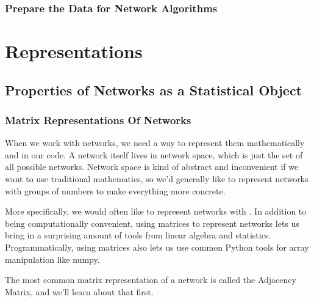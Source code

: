 \documentclass[letterpaper,10pt,english]{jupyterBook}
\begin{document}
\section{Prepare the Data for Network Algorithms}
\label{\detokenize{foundations/ch3/prepare-the-data:prepare-the-data-for-network-algorithms}}\label{\detokenize{foundations/ch3/prepare-the-data::doc}}

\part{Representations}


\chapter{Properties of Networks as a Statistical Object}
\label{\detokenize{representations/ch4/ch4:properties-of-networks-as-a-statistical-object}}\label{\detokenize{representations/ch4/ch4::doc}}

\section{Matrix Representations Of Networks}
\label{\detokenize{representations/ch4/matrix-representations:matrix-representations-of-networks}}\label{\detokenize{representations/ch4/matrix-representations::doc}}
\sphinxAtStartPar
When we work with networks, we need a way to represent them mathematically and in our code. A network itself lives in network space, which is just the set of all possible networks. Network space is kind of abstract and inconvenient if we want to use traditional mathematics, so we’d generally like to represent networks with groups of numbers to make everything more concrete.

\sphinxAtStartPar
More specifically, we would often like to represent networks with . In addition to being computationally convenient, using matrices to represent networks lets us bring in a surprising amount of tools from linear algebra and statistics. Programmatically, using matrices also lets us use common Python tools for array manipulation like numpy.

\sphinxAtStartPar
The most common matrix representation of a network is called the Adjacency Matrix, and we’ll learn about that first.
\end{document}
